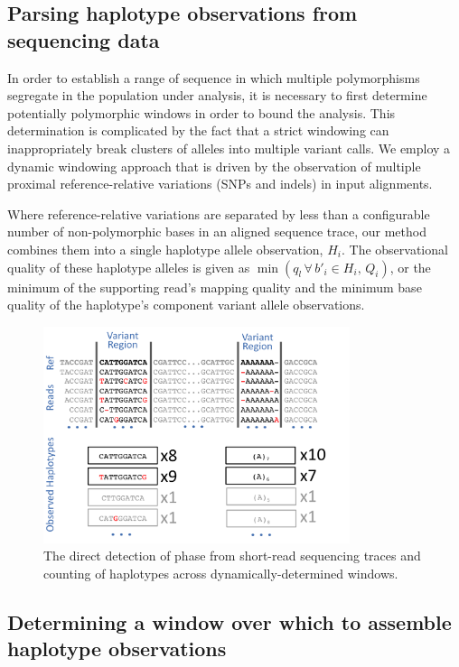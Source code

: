 \documentclass{article}
\begin{document}
\subsection{Parsing haplotype observations from sequencing data}
\label{sec:parsing}

In order to establish a range of sequence in which multiple polymorphisms segregate in the population under analysis, it is necessary to first determine potentially polymorphic windows in order to bound the analysis.  This determination is complicated by the fact that a strict windowing can inappropriately break clusters of alleles into multiple variant calls.  We employ a dynamic windowing approach that is driven by the observation of multiple proximal reference-relative variations (SNPs and indels) in input alignments.

Where reference-relative variations are separated by less than a configurable number of non-polymorphic bases in an aligned sequence trace, our method combines them into a single haplotype allele observation, $H_i$.  The observational quality of these haplotype alleles is given as $\min ( q_l \, \forall \, b'_i \in H_i , \, Q_i)$, or the minimum of the supporting read's mapping quality and the minimum base quality of the haplotype's component variant allele observations.

\begin{figure}[h!]
\centering
\includegraphics[width=0.8\textwidth]{haplotype_calling}
\caption{The direct detection of phase from short-read sequencing traces and counting of haplotypes across dynamically-determined windows.}
\label{fig:haplotypecalling}
\end{figure}

\subsection{Determining a window over which to assemble haplotype observations}
\end{document}
